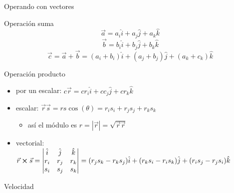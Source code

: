 \documentclass[serif]{beamer}
\begin{document}
\begin{frame}{Operando con vectores}
	\begin{block}{Operación suma}
		\[
			\vec{a}= a_i \hat{i} + a_j \hat{j}+ a_k \hat{k}
		\]
		\[
			\vec{b}= b_i \hat{i} + b_j \hat{j}+ b_k \hat{k}
		\]
		\[
			\vec{c} = \vec{a} + \vec{b} = (a_i+b_i) \hat{i} + (a_j+b_j) \hat{j}+ (a_k+c_k) \hat{k}
		\]
	\end{block}

\pause 

\begin{block}{Operación producto}
\begin{itemize}
	\item por un escalar: \(c \vec{r}= c r_i \hat{i} + c c_j \hat{j}+ c r_k \hat{k}\)
	\pause 
	\item escalar: \(\vec{r} \vec{s} = r s \cos(\theta) = r_i s_i+ r_j s_j + r_k s_k \)
	\begin{itemize}
		\item así el módulo es \(r = |\vec{r}| = \sqrt{\vec{r} \vec{r}}\) 
	\end{itemize}
	\pause 
	\item vectorial: \(\vec{r} \cross \vec{s} = \mdet{
	\hat{i} & \hat{j} & \hat{k} \\
	r_i & r_j & r_k\\
	s_i & s_j & s_k
	}
	= (r_j s_k - r_k s_j) \hat{i} + (r_k s_i - r_i s_k) \hat{j} + (r_i s_j - r_j s_i) \hat{k} 
	\)
\end{itemize}
\end{block}
\end{frame}



\begin{frame}
\begin{block}{Velocidad}
\end{block}

\end{frame}
\end{document}

